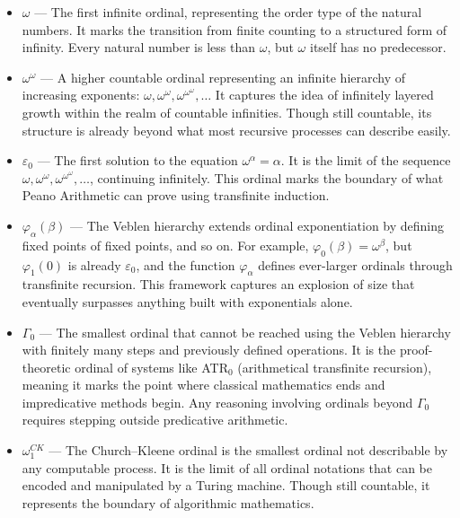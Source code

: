 \begin{itemize}
    \item $\omega$ — The first infinite ordinal, representing the order type of the natural numbers. It marks the transition from finite counting to a structured form of infinity. Every natural number is less than $\omega$, but $\omega$ itself has no predecessor.
    
    \item $\omega^\omega$ — A higher countable ordinal representing an infinite hierarchy of increasing exponents: $\omega, \omega^\omega, \omega^{\omega^\omega}, \ldots$ It captures the idea of infinitely layered growth within the realm of countable infinities. Though still countable, its structure is already beyond what most recursive processes can describe easily.
    
    \item $\varepsilon_0$ — The first solution to the equation $\omega^\alpha = \alpha$. It is the limit of the sequence $\omega, \omega^\omega, \omega^{\omega^\omega}, \ldots$, continuing infinitely. This ordinal marks the boundary of what Peano Arithmetic can prove using transfinite induction.
    
    \item $\varphi_\alpha(\beta)$ — The Veblen hierarchy extends ordinal exponentiation by defining fixed points of fixed points, and so on. For example, $\varphi_0(\beta) = \omega^\beta$, but $\varphi_1(0)$ is already $\varepsilon_0$, and the function $\varphi_\alpha$ defines ever-larger ordinals through transfinite recursion. This framework captures an explosion of size that eventually surpasses anything built with exponentials alone.
    
    \item $\Gamma_0$ — The smallest ordinal that cannot be reached using the Veblen hierarchy with finitely many steps and previously defined operations. It is the proof-theoretic ordinal of systems like ATR$_0$ (arithmetical transfinite recursion), meaning it marks the point where classical mathematics ends and impredicative methods begin. Any reasoning involving ordinals beyond $\Gamma_0$ requires stepping outside predicative arithmetic.
    
    \item $\omega_1^{CK}$ — The Church–Kleene ordinal is the smallest ordinal not describable by any computable process. It is the limit of all ordinal notations that can be encoded and manipulated by a Turing machine. Though still countable, it represents the boundary of algorithmic mathematics.
    

\end{itemize}
